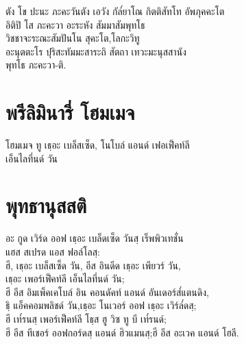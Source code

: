 \begin{leader}
\end{leader}

\begin{thaitrans}
ตัง โข ปะนะ ภะคะวันตัง เอวัง กัล๎ยาโณ กิตติสัทโท อัพภุคคะโต\\
อิติปิ โส ภะคะวา อะระหัง สัมมาสัมพุทโธ\\
วิชชาจะระณะสัมปันโน สุคะโต,โลกะวิทู\\
อะนุตตะโร ปุริสะทัมมะสาระถิ สัตถา เทวะมะนุสสานัง\\
\vin พุทโธ ภะคะวา-ติ.\\
\end{thaitrans}
\clearpage

\chapter{พรีลิมินารี่ โฮมเมจ}

\begin{leader}
\end{leader}

\begin{thaitrans}
โฮมเมจ ทู เธฺอะ เบล็สเซ็ด, โนโบล์ แอนด์ เฟอเฟ็คท์ลี\\
เอ็นไลทึ่นด์ วัน\\
\end{thaitrans}

\chapter{พุทธานุสสติ}

\begin{leader}
\end{leader}

\begin{thaitrans}
อะ กูด เวิร์ด ออฟ เธฺอะ เบล็ดเซ็ด วันสฺ เร็พพิวเทชั่น\\
\vin แฮส สเปรด แอส ฟอล์โลสฺ:\\
ฮี, เธฺอะ เบล็สเซ็ด วัน, อีส อินดีด เธฺอะ เพียวร์ วัน,\\
\vin เธฺอะ เพอร์เฟ็คท์ลี เอ็นไลทึ่นด์ วัน;\\
ฮี อีส อิมเพ็คเคโบล์ อิน คอนดัคท์ แอนด์ อันเดอร์ส๎แตนดิง,\\
\vin ธฺิ แอ็คคอมพลิชด์ วัน,เธฺอะ โนเวอร์ ออฟ เธฺอะ เวิร์ล๎ดสฺ;\\
ฮี เท๎รนสฺ เพอร์เฟ็คท์ลี โธฺส ฮู วิซ ทู บี เท๎รนด์;\\
\vin ฮี อีส ทีเชอร์ ออฟกอร์ดสฺ แอนด์ ฮิวแมนสฺ;ฮี อีส อะเวค แอนด์ โฮลี.\\
\end{thaitrans}
\clearpage

